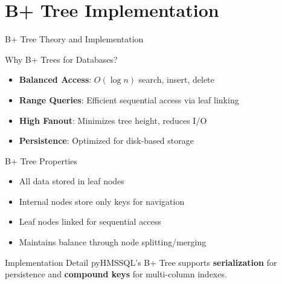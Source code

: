 \documentclass[aspectratio=169]{beamer}
\begin{document}
\section{B+ Tree Implementation}

\begin{frame}{B+ Tree Theory and Implementation}
\begin{block}{Why B+ Trees for Databases?}
\begin{itemize}
    \item \textbf{Balanced Access}: $O(\log n)$ search, insert, delete
    \item \textbf{Range Queries}: Efficient sequential access via leaf linking
    \item \textbf{High Fanout}: Minimizes tree height, reduces I/O
    \item \textbf{Persistence}: Optimized for disk-based storage
\end{itemize}
\end{block}

\begin{block}{B+ Tree Properties}
\begin{itemize}
    \item All data stored in leaf nodes
    \item Internal nodes store only keys for navigation
    \item Leaf nodes linked for sequential access
    \item Maintains balance through node splitting/merging
\end{itemize}
\end{block}

\begin{alertblock}{Implementation Detail}
pyHMSSQL's B+ Tree supports \textbf{serialization} for persistence and \textbf{compound keys} for multi-column indexes.
\end{alertblock}
\end{frame}
\end{document}
